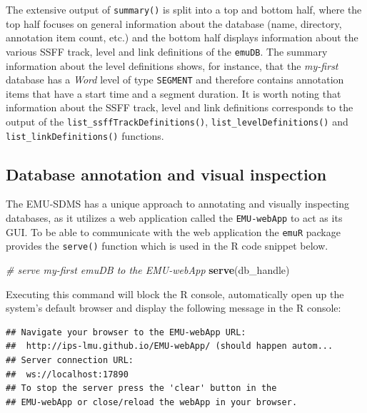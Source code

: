 \documentclass[]{book}
\newenvironment{Shaded}{\begin{snugshade}}{\end{snugshade}}
\newcommand{\CommentTok}[1]{\textcolor[rgb]{0.56,0.35,0.01}{\textit{#1}}}
\newcommand{\KeywordTok}[1]{\textcolor[rgb]{0.13,0.29,0.53}{\textbf{#1}}}
\newcommand{\NormalTok}[1]{#1}
\theoremstyle{definition}
\theoremstyle{definition}
\theoremstyle{definition}
\theoremstyle{remark}
\begin{document}
The extensive output of \texttt{summary()} is split into a top and
bottom half, where the top half focuses on general information about the
database (name, directory, annotation item count, etc.) and the bottom
half displays information about the various SSFF track, level and link
definitions of the \texttt{emuDB}. The summary information about the
level definitions shows, for instance, that the \emph{my-first} database
has a \emph{Word} level of type \texttt{SEGMENT} and therefore contains
annotation items that have a start time and a segment duration. It is
worth noting that information about the SSFF track, level and link
definitions corresponds to the output of the
\texttt{list\_ssffTrackDefinitions()}, \texttt{list\_levelDefinitions()}
and \texttt{list\_linkDefinitions()} functions.

\hypertarget{database-annotation-and-visual-inspection}{%
\subsection{Database annotation and visual
inspection}\label{database-annotation-and-visual-inspection}}

The EMU-SDMS has a unique approach to annotating and visually inspecting
databases, as it utilizes a web application called the
\texttt{EMU-webApp} to act as its GUI. To be able to communicate with
the web application the \texttt{emuR} package provides the
\texttt{serve()} function which is used in the R code snippet below.

\begin{Shaded}
\begin{Highlighting}[]
\CommentTok{# serve my-first emuDB to the EMU-webApp}
\KeywordTok{serve}\NormalTok{(db_handle)}
\end{Highlighting}
\end{Shaded}

Executing this command will block the R console, automatically open up
the system's default browser and display the following message in the R
console:

\begin{verbatim}
## Navigate your browser to the EMU-webApp URL: 
##  http://ips-lmu.github.io/EMU-webApp/ (should happen autom...
## Server connection URL:
##  ws://localhost:17890
## To stop the server press the 'clear' button in the 
## EMU-webApp or close/reload the webApp in your browser.
\end{verbatim}
\end{document}
